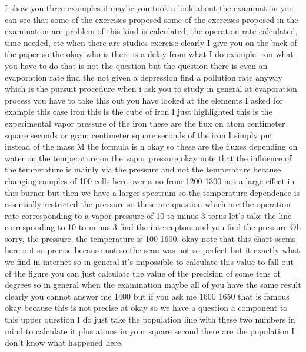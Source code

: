I show you three examples if maybe you took a look about the examination you can see that some of the exercises proposed some of the exercises proposed in the examination are problem of this kind is calculated, the operation rate calculated, time needed, etc when there are studies exercise clearly I give you on the back of the paper so the okay who is there is a delay from what I do example iron what you have to do that is not the question but the question there is even an evaporation rate find the not given a depression find a pollution rate anyway which is the pursuit procedure when i ask you to study in general at evaporation process you have to take this out you have looked at the elements I asked for example this case iron this is the cube of iron I just highlighted this is the experimental vapor pressure of the iron these are the flux on atom centimeter square seconds or gram centimeter square seconds of the iron I simply put instead of the mass M the formula is n okay so these are the fluxes depending on water on the temperature on the vapor pressure okay note that the influence of the temperature is mainly via the pressure and not the temperature because changing samples of 100 cells here over a no from 1200 1300 not a large effect in this burner but then we have a larger spectrum so the temperature dependence is essentially restricted the pressure so these are question which are the operation rate corresponding to a vapor pressure of 10 to minus 3 torus let's take the line corresponding to 10 to minus 3 find the interceptors and you find the pressure Oh sorry, the pressure, the temperature is 100 1600. okay note that this chart seems here not so precise because not so the scan was not so perfect but it exactly what we find in internet so in general it's impossible to calculate this value to fall out of the figure you can just calculate the value of the precision of some tens of degrees so in general when the examination maybe all of you have the same result clearly you cannot answer me 1400 but if you ask me 1600 1650 that is famous okay because this is not precise at okay so we have a question a component to this upper question I do just take the population line with these two numbers in mind to calculate it plus atoms in your square second there are the population I don't know what happened here.
